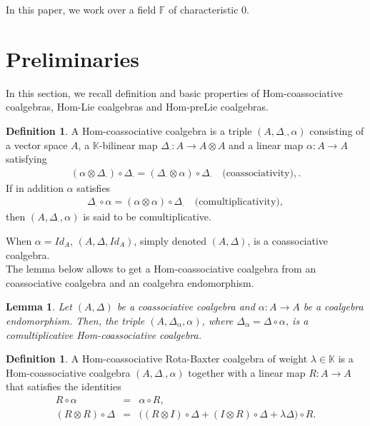 \documentclass{article}
\newtheorem{lem}[thm]{Lemma}
\theoremstyle{definition}
\newtheorem{defn}[thm]{Definition}
\theoremstyle{remark}
\numberwithin{equation}{section}
\begin{document}
In this paper, we work over a field $\mathbb{F}$ of characteristic $0$.
\section{Preliminaries}
In this section, we recall definition and basic properties of Hom-coassociative coalgebras, Hom-Lie coalgebras and Hom-preLie coalgebras.
\begin{defn}
 A Hom-coassociative coalgebra is a triple $(A,\Delta_\cdot,\alpha)$ consisting of a vector space $A$, a $\mathbb{K}$-bilinear map
$\Delta_\cdot : A\longrightarrow A\otimes A $ and a linear map $\alpha :A\longrightarrow A $ satisfying 
\begin{eqnarray}
(\alpha\otimes\Delta_\cdot)\circ\Delta_\cdot=(\Delta_\cdot\otimes\alpha)\circ\Delta_\cdot\quad\mbox{(coassociativity)}, \label{coasso}.
\end{eqnarray}
If in addition $\alpha$ satisfies
\begin{eqnarray}
\Delta_\cdot\circ\alpha=(\alpha\otimes\alpha)\circ\Delta_\cdot\quad\mbox{(comultiplicativity)}, \label{multip}
\end{eqnarray}
then $(A,\Delta_\cdot,\alpha)$ is said to be comultiplicative.
\end{defn}
When $\alpha=Id_A$, $(A,\Delta, Id_A)$, simply denoted $(A,\Delta)$, is a coassociative coalgebra.\\

 The lemma below allows to get a Hom-coassociative coalgebra from an coassociative coalgebra and an coalgebra endomorphism.
\begin{lem}\label{ha1}
 Let $(A,\Delta)$ be a coassociative coalgebra and $\alpha: A\longrightarrow A$ be a coalgebra endomorphism.
Then, the triple $(A,\Delta_\alpha,\alpha)$, where $\Delta_\alpha=\Delta\circ\alpha$, is a comultiplicative Hom-coassociative coalgebra.
\end{lem}
\begin{defn}
A Hom-coassociative Rota-Baxter coalgebra of weight $\lambda\in\mathbb{K}$ is a Hom-coassociative
coalgebra $(A, \Delta_\cdot, \alpha)$ together with a linear map $R : A\rightarrow A$ that satisfies the identities
\begin{eqnarray}
R\circ\alpha&=&\alpha\circ R,\\
(R\otimes R)\circ\Delta &=& \Big((R\otimes I)\circ\Delta + (I\otimes R)\circ\Delta +\lambda \Delta\Big)\circ R.
\end{eqnarray}
\end{defn}
\end{document}
